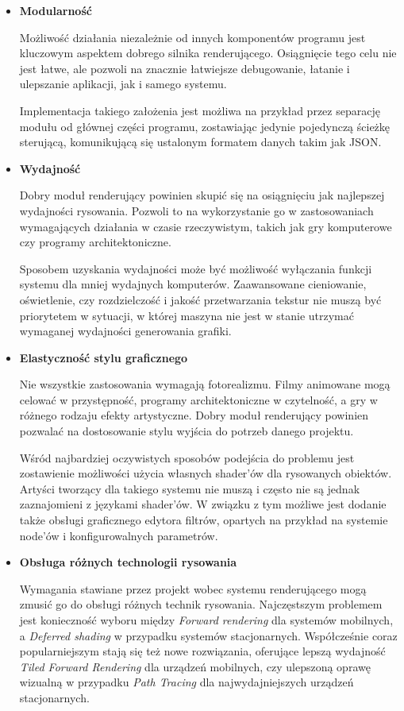 \begin{itemize}
	\item \textbf{Modularność}
	
	Możliwość działania niezależnie od innych komponentów programu jest kluczowym aspektem dobrego silnika renderującego. Osiągnięcie tego celu nie jest łatwe, ale pozwoli na znacznie łatwiejsze debugowanie, łatanie i ulepszanie aplikacji, jak i samego systemu.
	
	Implementacja takiego założenia jest możliwa na przykład przez separację modułu od głównej części programu, zostawiając jedynie pojedynczą ścieżkę sterującą, komunikującą się ustalonym formatem danych takim jak JSON.
	
	\item \textbf{Wydajność}
	
	Dobry moduł renderujący powinien skupić się na osiągnięciu jak najlepszej wydajności rysowania. Pozwoli to na wykorzystanie go w zastosowaniach wymagających działania w czasie rzeczywistym, takich jak gry komputerowe czy programy architektoniczne.
	
	Sposobem uzyskania wydajności może być możliwość wyłączania funkcji systemu dla mniej wydajnych komputerów. Zaawansowane cieniowanie, oświetlenie, czy rozdzielczość i jakość przetwarzania tekstur nie muszą być priorytetem w sytuacji, w której maszyna nie jest w stanie utrzymać wymaganej wydajności generowania grafiki.

	\item \textbf{Elastyczność stylu graficznego}

	Nie wszystkie zastosowania wymagają fotorealizmu. Filmy animowane mogą celować w przystępność, programy architektoniczne w czytelność, a gry w różnego rodzaju efekty artystyczne. Dobry moduł renderujący powinien pozwalać na dostosowanie stylu wyjścia do potrzeb danego projektu.
	
	Wśród najbardziej oczywistych sposobów podejścia do problemu jest zostawienie możliwości użycia własnych shader'ów dla rysowanych obiektów. Artyści tworzący dla takiego systemu nie muszą i często nie są jednak zaznajomieni z językami shader'ów. W związku z tym możliwe jest dodanie także obsługi graficznego edytora filtrów, opartych na przykład na systemie node'ów i konfigurowalnych parametrów.

	\item \textbf{Obsługa różnych technologii rysowania}

	Wymagania stawiane przez projekt wobec systemu renderującego mogą zmusić go do obsługi różnych technik rysowania. Najczęstszym problemem jest konieczność wyboru między \emph{Forward rendering} dla systemów mobilnych, a \emph{Deferred shading} w przypadku systemów stacjonarnych. Współcześnie coraz popularniejszym stają się też nowe rozwiązania, oferujące lepszą wydajność \emph{Tiled Forward Rendering} dla urządzeń mobilnych, czy ulepszoną oprawę wizualną w przypadku \emph{Path Tracing} dla najwydajniejszych urządzeń stacjonarnych.


\end{itemize}
